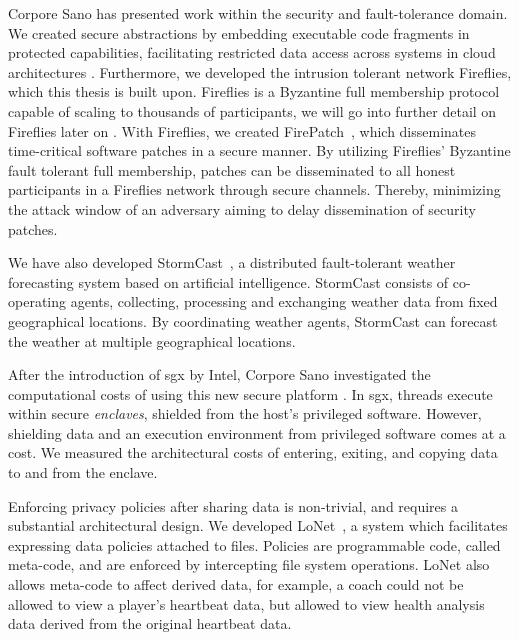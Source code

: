 \documentclass[USenglish]{uit-thesis}
\begin{document}
Corpore Sano has presented work within the security and fault-tolerance domain.
We created secure abstractions by embedding executable code fragments in protected capabilities, facilitating restricted data access across systems in cloud architectures \cite{codecap}.
Furthermore, we developed the intrusion tolerant network Fireflies, which this thesis is built upon.
Fireflies is a Byzantine full membership protocol capable of scaling to thousands of participants, we will go into further detail on Fireflies later on \cite{flies, flies2}.
With Fireflies, we created FirePatch~\cite{firepatch}, which disseminates time-critical software patches in a secure manner.
By utilizing Fireflies' Byzantine fault tolerant full membership, patches can be disseminated to all honest participants in a Fireflies network through secure channels.
Thereby, minimizing the attack window of an adversary aiming to delay dissemination of security patches.

We have also developed StormCast~\cite{hartvigsen}, a distributed fault-tolerant weather forecasting system based on artificial intelligence.
StormCast consists of co-operating agents, collecting, processing and exchanging weather data from fixed geographical locations.
By coordinating weather agents, StormCast can forecast the weather at multiple geographical locations.

After the introduction of \gls{sgx} by Intel, Corpore Sano investigated the computational costs of using this new secure platform \cite{anders}.
In \gls{sgx}, threads execute within secure \textit{enclaves}, shielded from the host's privileged software.
However, shielding data and an execution environment from privileged software comes at a cost. 
We measured the architectural costs of entering, exiting, and copying data to and from the enclave. 


Enforcing privacy policies after sharing data is non-trivial, and requires a substantial architectural design.
We developed LoNet~\cite{metacode}, a system which facilitates expressing data policies attached to files.
Policies are programmable code, called meta-code, and are enforced by intercepting file system operations.
LoNet also allows meta-code to affect derived data, for example, a coach could not be allowed to view a player's heartbeat data, but allowed to view health analysis data derived from the original heartbeat data. 




    
    
\end{document}
